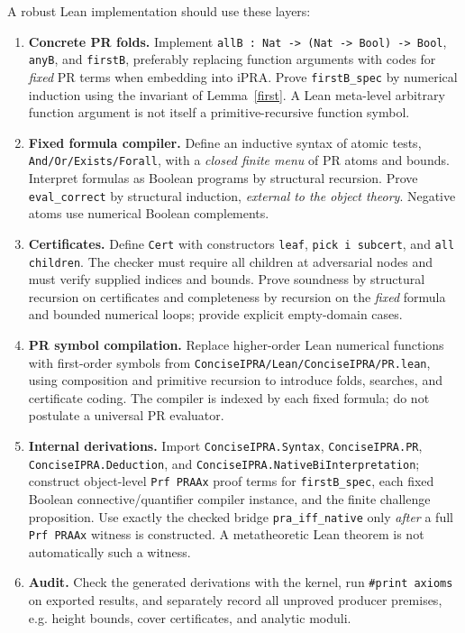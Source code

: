 \documentclass[11pt]{article}
\begin{document}
A robust Lean implementation should use these layers:
\begin{enumerate}
\item \textbf{Concrete PR folds.} Implement \texttt{allB : Nat -> (Nat -> Bool) -> Bool}, \texttt{anyB}, and \texttt{firstB}, preferably replacing function arguments with codes for \emph{fixed} PR terms when embedding into iPRA. Prove \texttt{firstB\_spec} by numerical induction using the invariant of Lemma~\ref{first}. A Lean meta-level arbitrary function argument is not itself a primitive-recursive function symbol.
\item \textbf{Fixed formula compiler.} Define an inductive syntax of atomic tests, \texttt{And/Or/Exists/Forall}, with a \emph{closed finite menu} of PR atoms and bounds. Interpret formulas as Boolean programs by structural recursion. Prove \texttt{eval\_correct} by structural induction, \emph{external to the object theory}. Negative atoms use numerical Boolean complements.
\item \textbf{Certificates.} Define \texttt{Cert} with constructors \texttt{leaf}, \texttt{pick i subcert}, and \texttt{all children}. The checker must require all children at adversarial nodes and must verify supplied indices and bounds. Prove soundness by structural recursion on certificates and completeness by recursion on the \emph{fixed} formula and bounded numerical loops; provide explicit empty-domain cases.
\item \textbf{PR symbol compilation.} Replace higher-order Lean numerical functions with first-order symbols from \texttt{ConciseIPRA/Lean/ConciseIPRA/PR.lean}, using composition and primitive recursion to introduce folds, searches, and certificate coding. The compiler is indexed by each fixed formula; do not postulate a universal PR evaluator.
\item \textbf{Internal derivations.} Import \texttt{ConciseIPRA.Syntax}, \texttt{ConciseIPRA.PR}, \texttt{ConciseIPRA.Deduction}, and \texttt{ConciseIPRA.NativeBiInterpretation}; construct object-level \texttt{Prf PRAAx} proof terms for \texttt{firstB\_spec}, each fixed Boolean connective/quantifier compiler instance, and the finite challenge proposition. Use exactly the checked bridge \texttt{pra\_iff\_native} only \emph{after} a full \texttt{Prf PRAAx} witness is constructed. A metatheoretic Lean theorem is not automatically such a witness.
\item \textbf{Audit.} Check the generated derivations with the kernel, run \texttt{\#print axioms} on exported results, and separately record all unproved producer premises, e.g. height bounds, cover certificates, and analytic moduli.
\end{enumerate}
\end{document}
